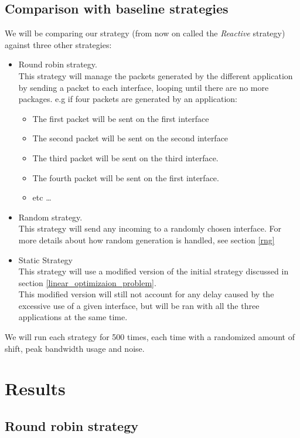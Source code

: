 \subsection{Comparison with baseline strategies}
We will be comparing our strategy (from now on called the \textit{Reactive} strategy) against three other strategies:
\begin{itemize}
	\item Round robin strategy. \\
		  This strategy will manage the packets generated by the different application by sending a packet to each interface, looping until there are no more packages. e.g if four packets are generated by an application:
		  \begin{itemize}
		  	\item The first packet will be sent on the first interface
		  	\item The second packet will be sent on the second interface
		  	\item The third packet will be sent on the third interface.
		  	\item The fourth packet will be sent on the first interface.
		  	\item etc \dots
		  \end{itemize}
	\item Random strategy. \\
		  This strategy will send any incoming to a randomly chosen interface. For more details about how random generation is handled, see section \ref{rng} 
	\item Static Strategy \\
		  This strategy will use a modified version of the initial strategy discussed in section \ref{linear_optimizaion_problem}. \\
		  This modified version will still not account for any delay caused by the excessive use of a given interface, but will be ran with all the three applications at the same time.		 
\end{itemize}

We will run each strategy for 500 times, each time with a randomized amount of shift, peak bandwidth usage and noise.


\section{Results}


\subsection{Round robin strategy}


